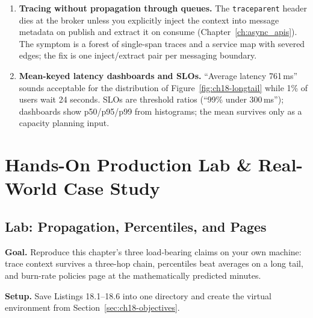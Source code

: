 \begin{enumerate}
        or a runbook is a deletion candidate. Dashboard count is not a
        maturity metric --- decision latency is.
  \item \textbf{Tracing without propagation through queues.} The
        \texttt{traceparent} header dies at the broker unless you
        explicitly inject the context into message metadata on publish and
        extract it on consume (Chapter~\ref{ch:async_apis}). The symptom is
        a forest of single-span traces and a service map with severed
        edges; the fix is one inject/extract pair per messaging boundary.
  \item \textbf{Mean-keyed latency dashboards and SLOs.} ``Average latency
        761\,ms'' sounds acceptable for the distribution of
        Figure~\ref{fig:ch18-longtail} while 1\% of users wait 24 seconds.
        SLOs are threshold ratios (``99\% under 300\,ms''); dashboards show
        p50/p95/p99 from histograms; the mean survives only as a capacity
        planning input.
\end{enumerate}

\section{Hands-On Production Lab \& Real-World Case Study}
\label{sec:ch18-lab}

\subsection*{Lab: Propagation, Percentiles, and Pages}

\textbf{Goal.} Reproduce this chapter's three load-bearing claims on your
own machine: trace context survives a three-hop chain, percentiles beat
averages on a long tail, and burn-rate policies page at the mathematically
predicted minutes.

\textbf{Setup.} Save Listings 18.1--18.6 into one directory and create the
virtual environment from Section~\ref{sec:ch18-objectives}.

